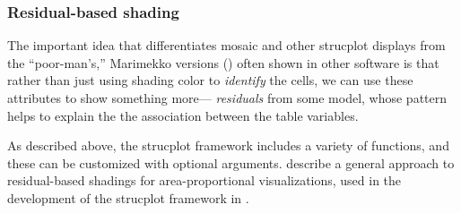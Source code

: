 \documentclass[11pt]{book}
\begin{document}
\subsubsection{Residual-based shading}
The important idea that differentiates mosaic and other strucplot displays from the 
``poor-man's,'' Marimekko versions ()
often shown in other software is that rather than
just using shading color to \emph{identify} the cells, we can use these attributes to
show something more--- \emph{residuals} from some model, whose pattern helps to explain
the the association between the table variables.

As described above, the strucplot framework includes a variety of  functions,
and these can be customized with optional arguments. 
\citet{Zeileis-etal:2007} describe a general approach to residual-based shadings for area-proportional
visualizations, used in the development of the strucplot framework in .
\end{document}
